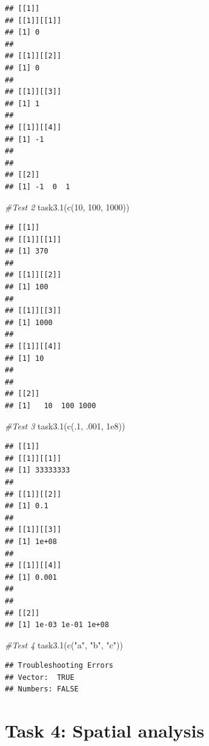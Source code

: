 \documentclass[
]{article}
\newenvironment{Shaded}{\begin{snugshade}}{\end{snugshade}}
\newcommand{\CommentTok}[1]{\textcolor[rgb]{0.56,0.35,0.01}{\textit{#1}}}
\newcommand{\DecValTok}[1]{\textcolor[rgb]{0.00,0.00,0.81}{#1}}
\newcommand{\FloatTok}[1]{\textcolor[rgb]{0.00,0.00,0.81}{#1}}
\newcommand{\FunctionTok}[1]{\textcolor[rgb]{0.00,0.00,0.00}{#1}}
\newcommand{\NormalTok}[1]{#1}
\newcommand{\StringTok}[1]{\textcolor[rgb]{0.31,0.60,0.02}{#1}}
\begin{document}
\begin{verbatim}
## [[1]]
## [[1]][[1]]
## [1] 0
## 
## [[1]][[2]]
## [1] 0
## 
## [[1]][[3]]
## [1] 1
## 
## [[1]][[4]]
## [1] -1
## 
## 
## [[2]]
## [1] -1  0  1
\end{verbatim}

\begin{Shaded}
\begin{Highlighting}[]
\CommentTok{\#Test 2}
\FunctionTok{task3.1}\NormalTok{(}\FunctionTok{c}\NormalTok{(}\DecValTok{10}\NormalTok{, }\DecValTok{100}\NormalTok{, }\DecValTok{1000}\NormalTok{))}
\end{Highlighting}
\end{Shaded}

\begin{verbatim}
## [[1]]
## [[1]][[1]]
## [1] 370
## 
## [[1]][[2]]
## [1] 100
## 
## [[1]][[3]]
## [1] 1000
## 
## [[1]][[4]]
## [1] 10
## 
## 
## [[2]]
## [1]   10  100 1000
\end{verbatim}

\begin{Shaded}
\begin{Highlighting}[]
\CommentTok{\#Test 3}
\FunctionTok{task3.1}\NormalTok{(}\FunctionTok{c}\NormalTok{(.}\DecValTok{1}\NormalTok{, .}\DecValTok{001}\NormalTok{, }\FloatTok{1e8}\NormalTok{))}
\end{Highlighting}
\end{Shaded}

\begin{verbatim}
## [[1]]
## [[1]][[1]]
## [1] 33333333
## 
## [[1]][[2]]
## [1] 0.1
## 
## [[1]][[3]]
## [1] 1e+08
## 
## [[1]][[4]]
## [1] 0.001
## 
## 
## [[2]]
## [1] 1e-03 1e-01 1e+08
\end{verbatim}

\begin{Shaded}
\begin{Highlighting}[]
\CommentTok{\#Test 4}
\FunctionTok{task3.1}\NormalTok{(}\FunctionTok{c}\NormalTok{(}\StringTok{"a"}\NormalTok{, }\StringTok{"b"}\NormalTok{, }\StringTok{"c"}\NormalTok{))}
\end{Highlighting}
\end{Shaded}

\begin{verbatim}
## Troubleshooting Errors
## Vector:  TRUE 
## Numbers: FALSE
\end{verbatim}

\hypertarget{task-4-spatial-analysis}{%
\section{Task 4: Spatial analysis}\label{task-4-spatial-analysis}}
\end{document}
